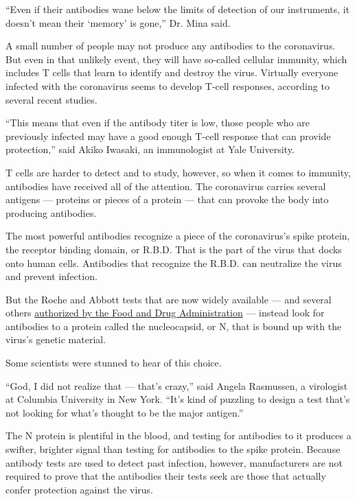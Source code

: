 ``Even if their antibodies wane below the limits of detection of our
instruments, it doesn't mean their `memory' is gone,'' Dr. Mina said.

A small number of people may not produce any antibodies to the
coronavirus. But even in that unlikely event, they will have so-called
cellular immunity, which includes T cells that learn to identify and
destroy the virus. Virtually everyone infected with the coronavirus
seems to develop T-cell responses, according to several recent studies.

``This means that even if the antibody titer is low, those people who
are previously infected may have a good enough T-cell response that can
provide protection,'' said Akiko Iwasaki, an immunologist at Yale
University.

T cells are harder to detect and to study, however, so when it comes to
immunity, antibodies have received all of the attention. The coronavirus
carries several antigens --- proteins or pieces of a protein --- that
can provoke the body into producing antibodies.

The most powerful antibodies recognize a piece of the coronavirus's
spike protein, the receptor binding domain, or R.B.D. That is the part
of the virus that docks onto human cells. Antibodies that recognize the
R.B.D. can neutralize the virus and prevent infection.

But the Roche and Abbott tests that are now widely available --- and
several others
\href{https://www.fda.gov/medical-devices/emergency-situations-medical-devices/eua-authorized-serology-test-performance}{authorized
by the Food and Drug Administration} --- instead look for antibodies to
a protein called the nucleocapsid, or N, that is bound up with the
virus's genetic material.

Some scientists were stunned to hear of this choice.

``God, I did not realize that --- that's crazy,'' said Angela Rasmussen,
a virologist at Columbia University in New York. ``It's kind of puzzling
to design a test that's not looking for what's thought to be the major
antigen.''

The N protein is plentiful in the blood, and testing for antibodies to
it produces a swifter, brighter signal than testing for antibodies to
the spike protein. Because antibody tests are used to detect past
infection, however, manufacturers are not required to prove that the
antibodies their tests seek are those that actually confer protection
against the virus.

